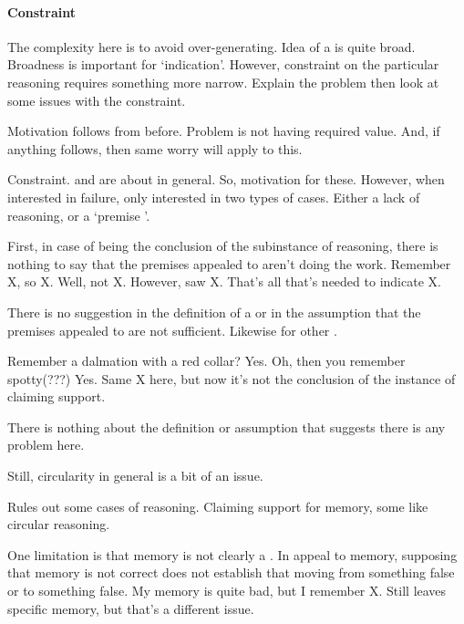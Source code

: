 \hozline

\paragraph{Constraint}

\begin{note}
  The complexity here is to avoid over-generating.
  Idea of a \requ{} is quite broad.
  Broadness is important for `indication'.
  However, constraint on the particular reasoning requires something more narrow.
  Explain the problem then look at some issues with the constraint.
\end{note}

\begin{note}
  Motivation follows from before.
  Problem is \requ{} not having required value.
  And, if anything follows, then same worry will apply to this.
\end{note}

\begin{note}
  Constraint.
  \ideaCSA{} and \ideaCSB{} are about  in general.
  So, motivation for these.
  However, when interested in failure, only interested in two types of cases.
  Either a lack of reasoning, or a `premise '.
\end{note}

\begin{note}
  First, in case of \requ{} being the conclusion of the subinstance of reasoning, there is nothing to say that the premises appealed to aren't doing the work.
  Remember X, so X.
  Well, not X.
  However, saw X.
  That's all that's needed to indicate X.

  There is no suggestion in the definition of a \requ{} or in the assumption that the premises appealed to are not sufficient.
  Likewise for other \requ{}.

  Remember a dalmation with a red collar?
  Yes.
  Oh, then you remember spotty(???)
  Yes.
  Same X here, but now it's not the conclusion of the instance of claiming support.

  There is nothing about the definition or assumption that suggests there is any problem here.
\end{note}

\begin{note}
  Still, circularity in general is a bit of an issue.

  Rules out some cases of reasoning.
  Claiming support for memory, some like circular reasoning.

  One limitation is that memory is not clearly a \requ{}.
  In appeal to memory, supposing that memory is not correct does not establish that moving from something false or to something false.
  My memory is quite bad, but I remember X.
  Still leaves specific memory, but that's a different issue.
\end{note}


